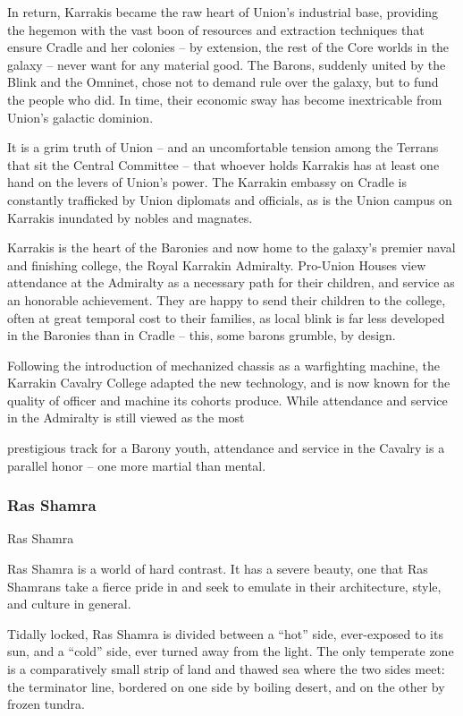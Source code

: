 In return, Karrakis became the raw heart of Union’s industrial base, providing the hegemon with
the vast boon of resources and extraction techniques that ensure Cradle and her colonies -- by
extension, the rest of the Core worlds in the galaxy -- never want for any material good. The
Barons, suddenly united by the Blink and the Omninet, chose not to demand rule over the galaxy,
but to fund the people who did. In time, their economic sway has become inextricable from
Union’s galactic dominion.

It is a grim truth of Union -- and an uncomfortable tension among the Terrans that sit the Central
Committee -- that whoever holds Karrakis has at least one hand on the levers of Union’s power.
The Karrakin embassy on Cradle is constantly trafficked by Union diplomats and officials, as is the
Union campus on Karrakis inundated by nobles and magnates.

Karrakis is the heart of the Baronies and now home to the galaxy’s premier naval and finishing
college, the Royal Karrakin Admiralty. Pro-Union Houses view attendance at the Admiralty as a
necessary path for their children, and service as an honorable achievement. They are happy to
send their children to the college, often at great temporal cost to their families, as local blink is far
less developed in the Baronies than in Cradle -- this, some barons grumble, by design.

Following the introduction of mechanized chassis as a warfighting machine, the Karrakin Cavalry
College adapted the new technology, and is now known for the quality of officer and machine its
cohorts produce. While attendance and service in the Admiralty is still viewed as the most




prestigious track for a Barony youth, attendance and service in the Cavalry is a parallel honor --
one more martial than mental.

\subsubsection{Ras Shamra}
Ras Shamra

Ras Shamra is a world of hard contrast. It has a severe beauty, one that Ras Shamrans take a
fierce pride in and seek to emulate in their architecture, style, and culture in general.

Tidally locked, Ras Shamra is divided between a “hot” side, ever-exposed to its sun, and a “cold”
side, ever turned away from the light. The only temperate zone is a comparatively small strip of
land and thawed sea where the two sides meet: the terminator line, bordered on one side by
boiling desert, and on the other by frozen tundra.

